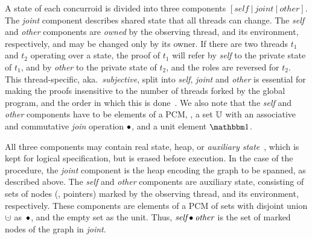 
A state of each concurroid is divided into three components
$[\mathit{self}~|~\mathit{joint}~|~\mathit{other}]$. The \emph{joint}
component describes shared state that all threads can change. The
\emph{self} and \emph{other} components are \emph{owned} by the
observing thread, and its environment, respectively, and may be
changed only by its owner. If there are two threads $t_1$ and $t_2$
operating over a state, the proof of $t_1$ will refer by \emph{self}
to the private state of $t_1$, and by \emph{other} to the private
state of $t_2$, and the roles are reversed for $t_2$.
This thread-specific, aka.~\emph{subjective}, split into \emph{self},
\emph{joint} and \emph{other} is essential for making the proofs
insensitive to the number of threads forked by the global program, and
the order in which this is done~\cite{LeyWild-Nanevski:POPL13}. We
also note that the \emph{self} and \emph{other} components have to be
elements of a PCM, \ie, a set $\mathbb{U}$ with an associative and
commutative \emph{join} operation $\bullet$, and a unit element $\pcmU$.

All three components may contain real state, \ie heap, or
\emph{auxiliary state}~\cite{Lucas:TR,Owicki-Gries:CACM76}, which is
kept for logical specification, but is erased before execution.
%
In the case of the  procedure, the \emph{joint} component
is the heap encoding the graph to be spanned, as described above.
%
%
The \emph{self} and \emph{other} components are auxiliary state,
consisting of sets of nodes (\ie, pointers) marked by the observing
thread, and its environment, respectively. These components are
elements of a PCM of sets with disjoint union $\dotcup$ as~$\bullet$,
and the empty set as the unit. Thus, $\emph{self} \bullet \emph{other}$
is the set of marked nodes of the graph in \emph{joint}.

%
 
